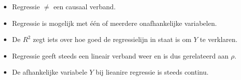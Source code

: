 \documentclass[
]{book}
\providecommand{\tightlist}{%
  \setlength{\itemsep}{0pt}\setlength{\parskip}{0pt}}
\theoremstyle{definition}
\theoremstyle{definition}
\theoremstyle{definition}
\theoremstyle{definition}
\theoremstyle{remark}
\begin{document}
\begin{itemize}
\tightlist
\item
  Regressie \(\neq\) een causaal verband.
\item
  Regressie is mogelijk met één of meerdere onafhankelijke variabelen.
\item
  De \(R^2\) zegt iets over hoe goed de regressielijn in staat is om \(Y\) te verklaren.
\item
  Regressie geeft steeds een lineair verband weer en is dus gerelateerd aan \(\rho\).
\item
  De afhankelijke variabele \(Y\) bij lieanire regressie is steeds continu.
\end{itemize}
\end{document}
